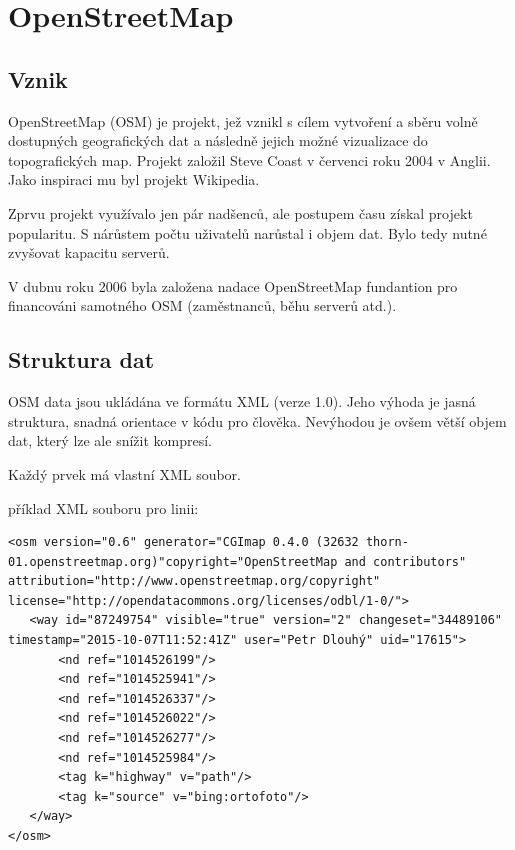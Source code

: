 \chapter{OpenStreetMap}%
\label{2-OpenStreetMap}


\section{Vznik}
\label{vznik}
OpenStreetMap (OSM) je projekt, jež vznikl s cílem vytvoření a sběru 
volně dostupných geografických dat a následně jejich možné vizualizace
do topografických map. Projekt založil Steve Coast v červenci roku 
2004 v Anglii. Jako inspiraci mu byl projekt Wikipedia. 

Zprvu projekt využívalo jen pár nadšenců, ale postupem času získal 
projekt popularitu. S nárůstem počtu uživatelů narůstal i objem dat. 
Bylo tedy nutné zvyšovat kapacitu serverů. 

V dubnu roku 2006 byla založena nadace OpenStreetMap fundantion pro financováni 
samotného OSM (zaměstnanců, běhu serverů atd.). 


\section{Struktura dat}
\label{struktura dat}

OSM data jsou ukládána ve formátu XML (verze 1.0). Jeho výhoda je jasná 
struktura, snadná orientace v kódu pro člověka. Nevýhodou je ovšem větší objem 
dat, který lze ale snížit kompresí. 

Každý prvek má vlastní XML soubor. 

příklad XML souboru pro linii:

{\scriptsize
\begin{lstlisting}
<osm version="0.6" generator="CGImap 0.4.0 (32632 thorn-01.openstreetmap.org)"copyright="OpenStreetMap and contributors" attribution="http://www.openstreetmap.org/copyright" license="http://opendatacommons.org/licenses/odbl/1-0/">
   <way id="87249754" visible="true" version="2" changeset="34489106" timestamp="2015-10-07T11:52:41Z" user="Petr Dlouhý" uid="17615">
       <nd ref="1014526199"/>
       <nd ref="1014525941"/>
       <nd ref="1014526337"/>
       <nd ref="1014526022"/>
       <nd ref="1014526277"/>
       <nd ref="1014525984"/>
       <tag k="highway" v="path"/>
       <tag k="source" v="bing:ortofoto"/>
   </way>
</osm>
\end{lstlisting}
}


